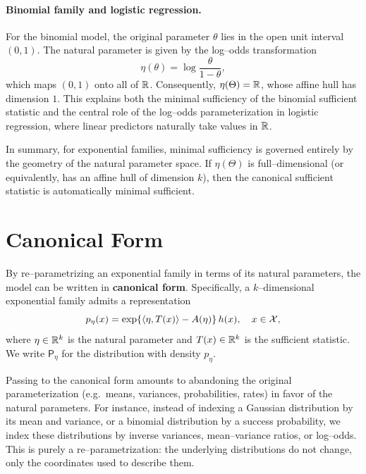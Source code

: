 \paragraph{Binomial family and logistic regression.}
For the binomial model, the original parameter \(\theta\) lies in the open unit interval
\((0,1)\).
The natural parameter is given by the log--odds transformation
\[
    \eta(\theta) = \log\frac{\theta}{1-\theta},
\]
which maps \((0,1)\) onto all of \(\mathbb{R}\).
Consequently, \(\eta(\Theta) = \mathbb{R}\), whose affine hull has dimension \(1\).
This explains both the minimal sufficiency of the binomial sufficient statistic and the
central role of the log--odds parameterization in logistic regression, where linear predictors
naturally take values in \(\mathbb{R}\).

In summary, for exponential families, minimal sufficiency is governed entirely by the geometry
of the natural parameter space.
If \(\eta(\Theta)\) is full--dimensional (or equivalently, has an affine hull of dimension \(k\)),
then the canonical sufficient statistic is automatically minimal sufficient.

%

\section{Canonical Form}
\label{sec:Canonical Form}

By re--parametrizing an exponential family in terms of its natural parameters, the model can be
written in \textbf{canonical form}. Specifically, a \(k\)--dimensional exponential family admits
a representation
\[
    p_{\eta}(x)
    = \exp\{\langle \eta, T(x) \rangle - A(\eta)\} \, h(x),
    \quad x \in \mathcal{X},
\]
where \(\eta \in \mathbb{R}^k\) is the natural parameter and \(T(x) \in \mathbb{R}^k\) is the sufficient statistic.
We write \(\mathsf{P}_{\eta}\) for the distribution with density \(p_{\eta}\).

Passing to the canonical form amounts to abandoning the original parameterization
(e.g.\ means, variances, probabilities, rates) in favor of the natural parameters.
For instance, instead of indexing a Gaussian distribution by its mean and variance,
or a binomial distribution by a success probability, we index these distributions by
inverse variances, mean--variance ratios, or log--odds.
This is purely a re--parametrization: the underlying distributions do not change, only the
coordinates used to describe them.

